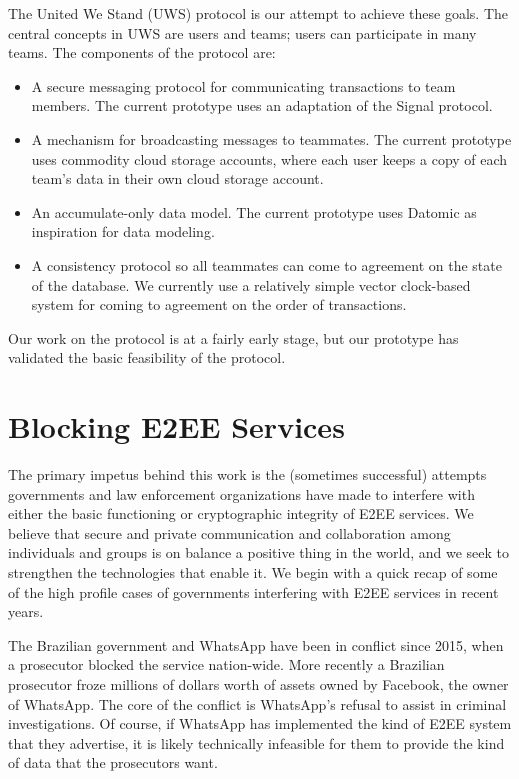 \documentclass{sig-alternate-hotpets}
\begin{document}
The United We Stand (UWS) protocol is our attempt to achieve these goals.
The central concepts in UWS are users and teams; users can participate in many teams.
The components of the protocol are:

\begin{itemize}
\item A secure messaging protocol for communicating transactions to team members.
  The current prototype uses an adaptation of the Signal protocol.
\item A mechanism for broadcasting messages to teammates.
  The current prototype uses commodity cloud storage accounts, where each user keeps a copy of each team's data in their own cloud storage account.
\item An accumulate-only data model.
  The current prototype uses Datomic as inspiration for data modeling.
\item A consistency protocol so all teammates can come to agreement on the state of the database.
  We currently use a relatively simple vector clock-based system for coming to agreement on the order of transactions.
\end{itemize}

Our work on the protocol is at a fairly early stage, but our prototype has validated the basic feasibility of the protocol.

\section{Blocking E2EE Services}

The primary impetus behind this work is the (sometimes successful) attempts governments and law enforcement organizations have made to interfere with either the basic functioning or cryptographic integrity of E2EE services.
We believe that secure and private communication and collaboration among individuals and groups is on balance a positive thing in the world, and we seek to strengthen the technologies that enable it.
We begin with a quick recap of some of the high profile cases of governments interfering with E2EE services in recent years.

The Brazilian government and WhatsApp have been in conflict since 2015, when a prosecutor blocked the service nation-wide.
More recently a Brazilian prosecutor froze millions of dollars worth of assets owned by Facebook, the owner of WhatsApp.
The core of the conflict is WhatsApp's refusal to assist in criminal investigations.
Of course, if WhatsApp has implemented the kind of E2EE system that they advertise, it is likely technically infeasible for them to provide the kind of data that the prosecutors want.
\end{document}
